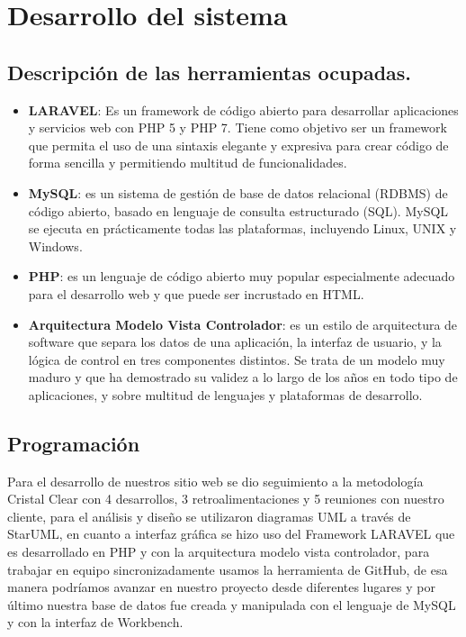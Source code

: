 \section{Desarrollo del sistema}
\subsection{Descripción de las herramientas ocupadas.}

\begin{itemize}


\item \textbf{LARAVEL}: Es un framework de código abierto para desarrollar aplicaciones y servicios web con PHP 5 y PHP 7. Tiene como objetivo ser un framework que permita el uso de una sintaxis elegante y expresiva para crear código de forma sencilla y permitiendo multitud de funcionalidades.

\item \textbf{MySQL}: es un sistema de gestión de base de datos relacional (RDBMS) de código abierto, basado en lenguaje de consulta estructurado (SQL). MySQL se ejecuta en prácticamente todas las plataformas, incluyendo Linux, UNIX y Windows.

\item \textbf{PHP}: es un lenguaje de código abierto muy popular especialmente adecuado para el desarrollo web y que puede ser incrustado en HTML.

\item \textbf{Arquitectura Modelo Vista Controlador}: es un estilo de arquitectura de software que separa los datos de una aplicación, la interfaz de usuario, y la lógica de control en tres componentes distintos. Se trata de un modelo muy maduro y que ha demostrado su validez a lo largo de los años en todo tipo de aplicaciones, y sobre multitud de lenguajes y plataformas de desarrollo.



\end{itemize}

\subsection{Programación}

Para el desarrollo de nuestros sitio web se dio seguimiento a la metodología Cristal Clear  con 4 desarrollos, 3 retroalimentaciones  y 5 reuniones con nuestro cliente, para el análisis y diseño se utilizaron diagramas UML a través de StarUML, en cuanto a interfaz gráfica se hizo uso del Framework LARAVEL que es desarrollado en PHP y con la arquitectura modelo vista controlador, para trabajar en equipo sincronizadamente usamos la herramienta de GitHub, de esa manera podríamos avanzar en nuestro proyecto desde diferentes lugares y por último nuestra base de datos fue creada y manipulada con el lenguaje de MySQL y con la interfaz de Workbench.





